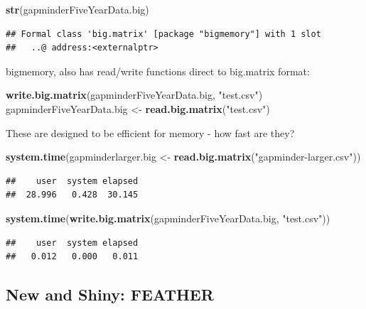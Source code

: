 \documentclass[]{article}
\newenvironment{Shaded}{\begin{snugshade}}{\end{snugshade}}
\newcommand{\KeywordTok}[1]{\textcolor[rgb]{0.13,0.29,0.53}{\textbf{{#1}}}}
\newcommand{\StringTok}[1]{\textcolor[rgb]{0.31,0.60,0.02}{{#1}}}
\newcommand{\NormalTok}[1]{{#1}}
\begin{document}
\begin{Shaded}
\begin{Highlighting}[]
\KeywordTok{str}\NormalTok{(gapminderFiveYearData.big)}
\end{Highlighting}
\end{Shaded}

\begin{verbatim}
## Formal class 'big.matrix' [package "bigmemory"] with 1 slot
##   ..@ address:<externalptr>
\end{verbatim}

bigmemory, also has read/write functions direct to big.matrix format:

\begin{Shaded}
\begin{Highlighting}[]
\KeywordTok{write.big.matrix}\NormalTok{(gapminderFiveYearData.big, }\StringTok{"test.csv"}\NormalTok{)}
\NormalTok{gapminderFiveYearData.big <-}\StringTok{ }\KeywordTok{read.big.matrix}\NormalTok{(}\StringTok{"test.csv"}\NormalTok{)}
\end{Highlighting}
\end{Shaded}

These are designed to be efficient for memory - how fast are they?

\begin{Shaded}
\begin{Highlighting}[]
\KeywordTok{system.time}\NormalTok{(gapminderlarger.big <-}\StringTok{ }\KeywordTok{read.big.matrix}\NormalTok{(}\StringTok{"gapminder-larger.csv"}\NormalTok{))}
\end{Highlighting}
\end{Shaded}

\begin{verbatim}
##    user  system elapsed 
##  28.996   0.428  30.145
\end{verbatim}

\begin{Shaded}
\begin{Highlighting}[]
\KeywordTok{system.time}\NormalTok{(}\KeywordTok{write.big.matrix}\NormalTok{(gapminderFiveYearData.big, }\StringTok{"test.csv"}\NormalTok{))}
\end{Highlighting}
\end{Shaded}

\begin{verbatim}
##    user  system elapsed 
##   0.012   0.000   0.011
\end{verbatim}

\subsection{New and Shiny: FEATHER}\label{new-and-shiny-feather}
\end{document}
